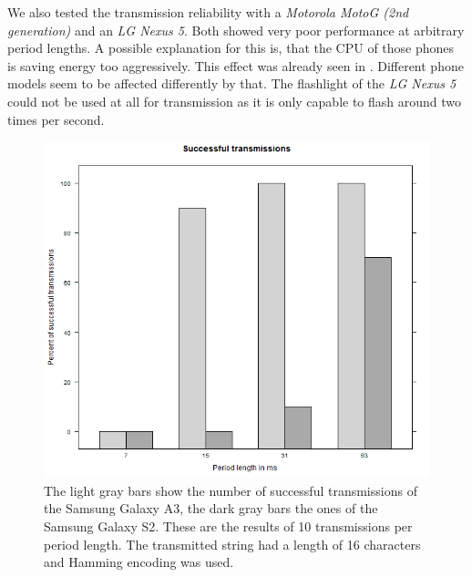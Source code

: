 \documentclass{sig-alternate} %
\begin{document}
We also tested the transmission reliability with a \textit{Motorola MotoG (2nd generation)} and an \textit{LG Nexus 5}.
Both showed very poor performance at arbitrary period lengths.
A possible explanation for this is, that the CPU of those phones is saving energy too aggressively.
This effect was already seen in \cite{mongia2010reliable}.
Different phone models seem to be affected differently by that.
The flashlight of the \textit{LG Nexus 5} could not be used at all for transmission as it is only capable to flash around two times per second.

\begin{figure}
	\centering
	\includegraphics[scale=.35]{images/successful-transmissions.png}
	\caption{The light gray bars show the number of successful transmissions of the Samsung Galaxy A3, the dark gray bars the ones of the Samsung Galaxy S2. These are the results of 10 transmissions per period length. The transmitted string had a length of 16 characters and Hamming encoding was used.}
	\label{fig:successful_transmissions}
\end{figure}
\end{document}

